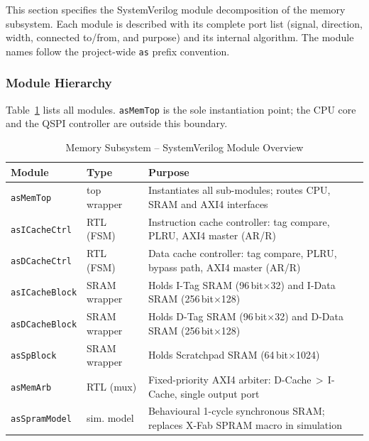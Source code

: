 This section specifies the SystemVerilog module decomposition of the
memory subsystem.
Each module is described with its complete port list (signal, direction,
width, connected to/from, and purpose) and its internal algorithm.
The module names follow the project-wide \texttt{as} prefix convention.

\subsubsection{Module Hierarchy}
\label{subsubsec:modHierarchy}

Table~\ref{tab:asModHierarchy} lists all modules.
\texttt{asMemTop} is the sole instantiation point; the CPU core and the
QSPI controller are outside this boundary.

\begin{table}[H]
\caption{Memory Subsystem -- SystemVerilog Module Overview}
\label{tab:asModHierarchy}
\centering
\begin{tabularx}{\textwidth}{|l |l |X|}
  \hline
  Module & Type & Purpose \\
  \hline
  \hline
  \texttt{asMemTop}      & top wrapper   & Instantiates all sub-modules; routes CPU, SRAM and AXI4 interfaces \\
  \hline
  \texttt{asICacheCtrl}  & RTL (FSM)     & Instruction cache controller: tag compare, PLRU, AXI4 master (AR/R) \\
  \hline
  \texttt{asDCacheCtrl}  & RTL (FSM)     & Data cache controller: tag compare, PLRU, bypass path, AXI4 master (AR/R) \\
  \hline
  \texttt{asICacheBlock} & SRAM wrapper  & Holds I-Tag SRAM (96\,bit$\times$32) and I-Data SRAM (256\,bit$\times$128) \\
  \hline
  \texttt{asDCacheBlock} & SRAM wrapper  & Holds D-Tag SRAM (96\,bit$\times$32) and D-Data SRAM (256\,bit$\times$128) \\
  \hline
  \texttt{asSpBlock}     & SRAM wrapper  & Holds Scratchpad SRAM (64\,bit$\times$1024) \\
  \hline
  \texttt{asMemArb}      & RTL (mux)     & Fixed-priority AXI4 arbiter: D-Cache\,$>$\,I-Cache, single output port \\
  \hline
  \texttt{asSpramModel}  & sim. model    & Behavioural 1-cycle synchronous SRAM; replaces X-Fab SPRAM macro in simulation \\
  \hline
\end{tabularx}
\end{table}

